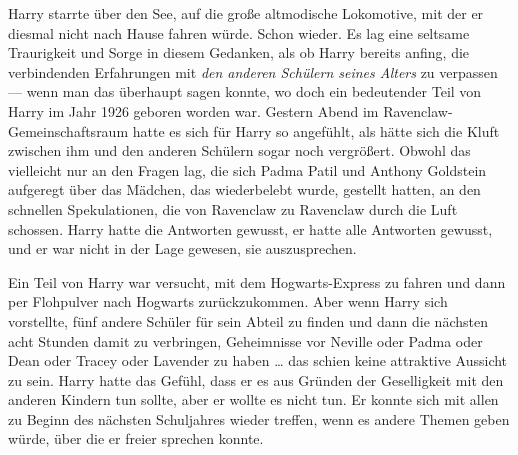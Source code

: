Harry starrte über den See, auf die große altmodische Lokomotive, mit der er diesmal nicht nach Hause fahren würde. Schon wieder. Es lag eine seltsame Traurigkeit und Sorge in diesem Gedanken, als ob Harry bereits anfing, die verbindenden Erfahrungen mit \emph{den anderen Schülern seines Alters} zu verpassen — wenn man das überhaupt sagen konnte, wo doch ein bedeutender Teil von Harry im Jahr 1926 geboren worden war. Gestern Abend im Ravenclaw-Gemeinschaftsraum hatte es sich für Harry so angefühlt, als hätte sich die Kluft zwischen ihm und den anderen Schülern sogar noch vergrößert. Obwohl das vielleicht nur an den Fragen lag, die sich Padma Patil und Anthony Goldstein aufgeregt über das Mädchen, das wiederbelebt wurde, gestellt hatten, an den schnellen Spekulationen, die von Ravenclaw zu Ravenclaw durch die Luft schossen. Harry hatte die Antworten gewusst, er hatte alle Antworten gewusst, und er war nicht in der Lage gewesen, sie auszusprechen.

Ein Teil von Harry war versucht, mit dem Hogwarts-Express zu fahren und dann per Flohpulver nach Hogwarts zurückzukommen. Aber wenn Harry sich vorstellte, fünf andere Schüler für sein Abteil zu finden und dann die nächsten acht Stunden damit zu verbringen, Geheimnisse vor Neville oder Padma oder Dean oder Tracey oder Lavender zu haben … das schien keine attraktive Aussicht zu sein. Harry hatte das Gefühl, dass er es aus Gründen der Geselligkeit mit den anderen Kindern tun sollte, aber er wollte es nicht tun. Er konnte sich mit allen zu Beginn des nächsten Schuljahres wieder treffen, wenn es andere Themen geben würde, über die er freier sprechen konnte.

